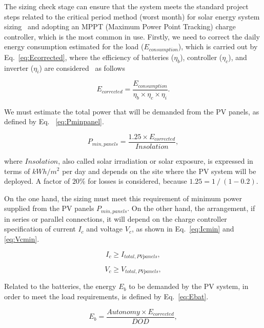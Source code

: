 \documentclass[runningheads]{llncs}
\begin{document}
The sizing check stage can ensure that the system meets the standard project steps related to the critical period method (worst month) for solar energy system sizing~\cite{Pinho} and adopting an MPPT (Maximum Power Point Tracking) charge controller, which is the most common in use. Firstly, we need to correct the daily energy consumption estimated for the load ($E_{consumption}$), which is carried out by Eq.~\eqref{eq:Ecorrected}, where the efficiency of batteries ($\eta_{b}$), controller ($\eta_{c}$), and inverter ($\eta_{i}$) are considered~\cite{Pinho} as follows

\begin{equation}
\label{eq:Ecorrected}
E_{corrected} = \dfrac{E_{consumption}}{\eta_{b} \times \eta_{c} \times \eta_{i} }.
\end{equation}

We must estimate the total power that will be demanded from the PV panels, as defined by Eq. ~\eqref{eq:Pminpanel}.

\begin{equation}
\label{eq:Pminpanel}
P_{min,panels} = \dfrac{1.25 \times E_{corrected}}{Insolation},
\end{equation}

\noindent where $Insolation$, also called solar irradiation or solar exposure, is expressed in terms of $kWh/m^{2}$ per day and depends on the site where the PV system will be deployed. A factor of $20$\% for losses is considered, because $1.25 = 1 \mathbin{/} (1 - 0.2)$.

On the one hand, the sizing must meet this requirement of minimum power supplied from the PV panels $P_{min,panels}$. On the other hand, the arrangement, if in series or parallel connections, it will depend on the charge controller specification of current $I_{c}$ and voltage $V_{c}$, as shown in Eq.~\eqref{eq:Icmin} and 
\eqref{eq:Vcmin}.

\begin{equation}
\label{eq:Icmin}
I_{c} \geq I_{total,PVpanels},
\end{equation}

\begin{equation}
\label{eq:Vcmin}
V_{c} \geq V_{total,PVpanels},
\end{equation}

Related to the batteries, the energy $E_{b}$ to be demanded by the PV system, in order to meet the load requirements, is defined by Eq.~\eqref{eq:Ebat}.

\begin{equation}
\label{eq:Ebat}
E_{b} = \dfrac{Autonomy \times E_{corrected}}{DOD},
\end{equation}
\end{document}
